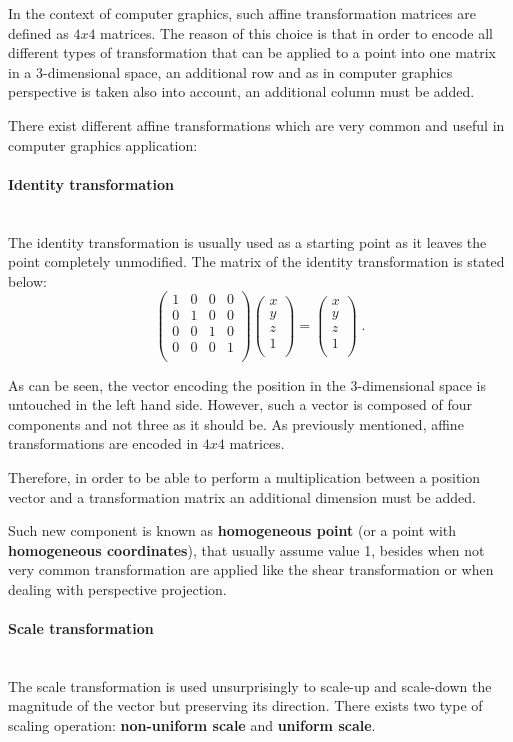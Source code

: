 \documentclass[12pt,a4paper]{extarticle}
\newcommand{\linespace}{\vspace{0pt}}
\newcommand{\myparagraph}[1]{\paragraph{#1}\mbox{}\\}
\begin{document}
In the context of computer graphics, such affine transformation matrices are defined as $4x4$ matrices. The reason of this choice is that in order to encode all different types of transformation that can be applied to a point into one matrix in a 3-dimensional space, an additional row and as in computer graphics perspective is taken also into account, an additional column must be added.
\linespace

There exist different affine transformations which are very common and useful in computer graphics application:
\myparagraph{Identity transformation} The identity transformation is usually used as a starting point as it leaves the point completely unmodified. The matrix of the identity transformation is stated below:
\[
\begin{pmatrix}
1 & 0 & 0 & 0\\
0 & 1 & 0 & 0\\
0 & 0 & 1 & 0\\
0 & 0 & 0 & 1\\
\end{pmatrix}
\begin{pmatrix}
x\\
y\\
z\\
1\\
\end{pmatrix}
=
\begin{pmatrix}
x\\
y\\
z\\
1\\
\end{pmatrix}
\;.
\]

As can be seen, the vector encoding the position in the 3-dimensional space is untouched in the left hand side. However, such a vector is composed of four components and not three as it should be. As previously mentioned, affine transformations are encoded in $4x4$ matrices.

Therefore, in order to be able to perform a multiplication between a position vector and a transformation matrix an additional dimension must be added. 
 
Such new component is known as \textbf{homogeneous point} (or a point with \textbf{homogeneous coordinates}), that usually assume value 1, besides when not very common transformation are applied like the shear transformation or when dealing with perspective projection.

\myparagraph{Scale transformation} The scale transformation is used unsurprisingly to scale-up and scale-down the magnitude of the vector but preserving its direction. There exists two type of scaling operation: \textbf{non-uniform scale} and \textbf{uniform scale}. 
\end{document}

